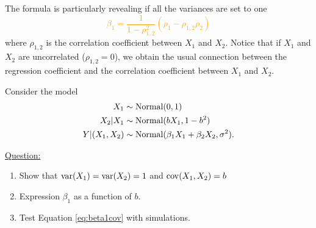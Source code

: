\begin{itemize}
The formula is particularly revealing if all the variances are set to one\textcolor{orange}{
\begin{equation*}
\beta_1 = \frac{1}{1-\rho_{1,2}^2}(\rho_1 - \rho_{1,2}\rho_2)
\end{equation*}}
where $\rho_{1,2}$ is the correlation coefficient between $X_1$ and $X_2$. Notice that if $X_1$ and $X_2$ are uncorrelated ($\rho_{1,2}=0$), we obtain the usual connection between the regression coefficient and the correlation coefficient between $X_1$ and $X_2$. 
%
%
%
\begin{example}\label{ex:normal_pred}
Consider the model
\begin{align*}
X_1 &\sim {\rm Normal}(0,1)\\
X_2|X_1 &\sim {\rm Normal}(bX_1,1-b^2)\\
Y|(X_1,X_2) & \sim {\rm Normal}(\beta_1X_1 + \beta_2X_2,\sigma^2). 
\end{align*}


\noindent
\underline{Question:} 
\begin{enumerate}[label=(\alph*)]
\item Show that ${\rm var}(X_1) = {\rm var}(X_2) = 1$ and ${\rm cov}(X_1,X_2)=b$
\item Expression $\beta_1$ as a function of $b$. 
\item Test Equation \ref{eq:beta1cov} with simulations. \\
\end{enumerate}




\end{example}
\end{itemize}
